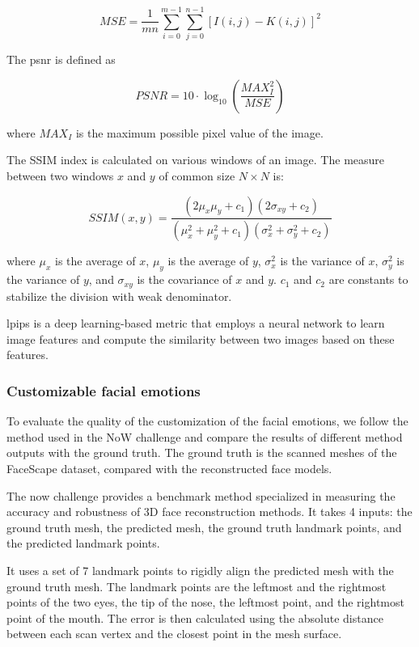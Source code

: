 \begin{equation}
    MSE = \frac{1}{mn}\sum_{i=0}^{m-1}\sum_{j=0}^{n-1}[I(i,j)-K(i,j)]^2
\end{equation}

The \acrshort{psnr} is defined as

\[
    PSNR = 10\cdot\log_{10}\left(\frac{MAX_I^2}{MSE}\right)
\]

where $MAX_{I}$ is the maximum possible pixel value of the image.

The SSIM index is calculated on various windows of an image. The measure between two windows $x$ and $y$ of common size $N \times N$ is:

\begin{equation}
    SSIM(x,y) = \frac{(2\mu_x\mu_y + c_1)(2\sigma_{xy}+c_2)}{(\mu_x^2+\mu_y^2+c_1)(\sigma_x^2+\sigma_y^2+c_2)}
\end{equation}

where $\mu_x$ is the average of $x$, $\mu_y$ is the average of $y$, $\sigma_x^2$ is the variance of $x$, $\sigma_y^2$ is the variance of $y$, and $\sigma_{xy}$ is the covariance of $x$ and $y$. $c_1$ and $c_2$ are constants to stabilize the division with weak denominator.


\acrshort{lpips} \cite{zhangUnreasonableEffectivenessDeep2018} is a deep learning-based metric that employs a neural network to learn image features and compute the similarity between two images based on these features.

\subsubsection{Customizable facial emotions}
To evaluate the quality of the customization of the facial emotions, we follow the method used in the NoW challenge and compare the results of different method outputs with the ground truth. The ground truth is the scanned meshes of the FaceScape dataset, compared with the reconstructed face models.

The \acrshort{now} challenge \cite{RingNet:CVPR:2019} provides a benchmark method specialized in measuring the accuracy and robustness of 3D face reconstruction methods. It takes 4 inputs: the ground truth mesh, the predicted mesh, the ground truth landmark points, and the predicted landmark points.

It uses a set of 7 landmark points to rigidly align the predicted mesh with the ground truth mesh. The landmark points are the leftmost and the rightmost points of the two eyes, the tip of the nose, the leftmost point, and the rightmost point of the mouth. The error is then calculated using the absolute distance between each scan vertex and the closest point in the mesh surface.

